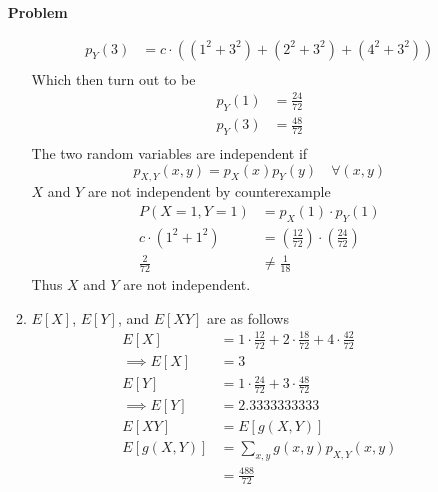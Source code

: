 \documentclass[12pt]{article}
\newenvironment{Ex}{\textbf{Problem}\vspace{.75em}\\}{}
\begin{document}
\begin{enumerate}
\begin{Ex}
\begin{solution}
\begin{enumerate}
\begin{equation}
\begin{aligned}
            p_Y(3) &= c\cdot((1^2+3^2) + (2^2+3^2) + (4^2+3^2)) \\
          \end{aligned}
        \end{equation}
        Which then turn out to be
        \begin{equation}
          \label{eq:2d-marginal-y-values}
          \begin{aligned}
            p_Y(1) &= \frac{24}{72} \\
            p_Y(3) &= \frac{48}{72} \\
          \end{aligned}
        \end{equation}
        The two random variables are independent if
        \begin{equation}
          \label{eq:2d-independent}
          p_{X,Y}(x,y) = p_X(x)p_Y(y) \quad \forall (x,y)
        \end{equation}
        $X$ and $Y$ are not independent by counterexample
        \begin{equation}
          \label{eq:2d-counterexample}
          \begin{aligned}
            P(X=1, Y=1) &= p_X(1) \cdot p_Y(1) \\
            c\cdot(1^2 + 1^2)&=
            \left(\frac{12}{72}\right)\cdot\left(\frac{24}{72}\right)
            \\
            \frac{2}{72} &\not= \frac{1}{18}
          \end{aligned}
        \end{equation}
        Thus $X$ and $Y$ are not independent.
      \item $E[X]$, $E[Y]$, and $E[XY]$ are as follows
        \begin{equation}
          \label{eq:2e-expectation-x-y-xy}
          \begin{aligned}
            E[X] &= 1\cdot\frac{12}{72} + 2\cdot\frac{18}{72} +
            4\cdot\frac{42}{72} \\
            \implies E[X] &= 3 \\
            E[Y] &= 1\cdot\frac{24}{72} + 3\cdot\frac{48}{72} \\
            \implies E[Y] &= 2.3333333333 \\
            E[XY] &= E[g(X,Y)] \\
            E[g(X,Y)] &= \sum_{x,y} g(x,y)p_{X,Y}(x,y) \\
            &= \frac{488}{72} \\

\end{aligned}
\end{equation}
\end{enumerate}
\end{solution}
\end{Ex}
\end{enumerate}
\end{document}
